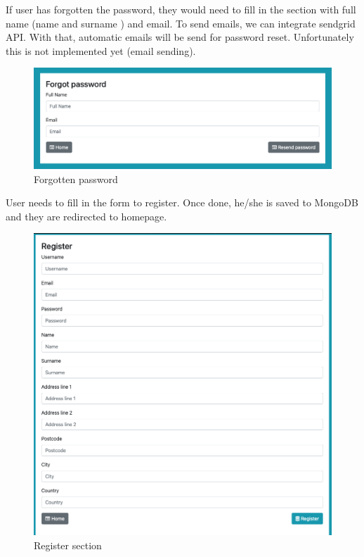 If user has forgotten the password, they would need to fill in the section with full name (name and surname ) and email. To send emails, we can integrate sendgrid API. With that, automatic emails will be send for password reset. Unfortunately this is not implemented yet (email sending). 
\begin{figure}[H]
\includegraphics[scale=0.4]{img/forgotPassowrd.jpeg}
\centering
\caption{Forgotten password}
\end{figure}

User needs to fill in the form to register. Once done, he/she is saved to MongoDB and they are redirected to homepage.
\begin{figure}[H]
\includegraphics[scale=0.4]{img/register.jpeg}
\centering
\caption{Register section}
\end{figure}

